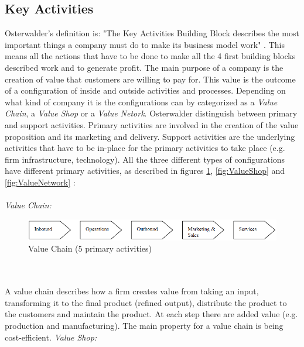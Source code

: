 \subsection{Key Activities}
Osterwalder’s definition is: "The Key Activities Building Block describes the most important things a company must do to make its business model work" \cite{osterwalder}. This means all the actions that have to be done to make all the 4 first building blocks described work and to generate profit. The main purpose of a company is the creation of value that customers are willing to pay for. This value is the outcome of a configuration of inside and outside activities and processes. Depending on what kind of company it is the configurations can by categorized as a \emph{Value Chain}, a \emph{Value Shop} or a \emph{Value Netork}. Osterwalder distinguish between primary and support activities. Primary activities are involved in the creation of the value proposition and its marketing and delivery. Support activities are the underlying activities that have to be in-place for the primary activities to take place (e.g. firm infrastructure, technology). All the three different types of configurations have different primary activities, as described in  figures \ref{fig:ValueChain}, \ref{fig:ValueShop} and \ref{fig:ValueNetwork} \cite{osterwalderthesis}:\\ \\
\emph{Value Chain:}
\begin{figure}[h]
\centering
\begin{center}
\includegraphics[scale=0.6]{valuechainnew}
\caption[Value Chain]{Value Chain (5 primary activities) \cite{osterwalderthesis}}
\label{fig:ValueChain}
\end{center}
\end{figure} \\ \\
A value chain describes how a firm creates value from taking an input, transforming it to the final product (refined output), distribute the product  to the customers and maintain the product. At each step there are added value (e.g. production and manufacturing). The main property for a value chain is being cost-efficient.
\newpage
\emph{Value Shop:}

